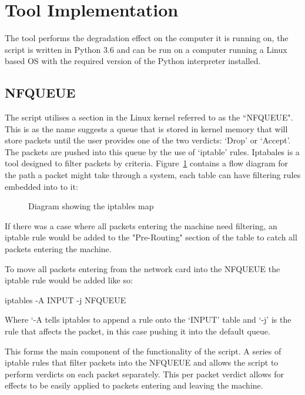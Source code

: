 %
\section{Tool Implementation}
The tool performs the degradation effect on the computer it is running on, the script is written in Python 3.6 \citep{pranskevichuspython} and can be run on a computer running a Linux based OS with the required version of the Python interpreter installed.


\subsection{NFQUEUE}
\label{ref:nfqueue}
The script utilises a section in the Linux kernel referred to as the ``NFQUEUE". This is as the name suggests a queue that is stored in kernel memory that will store packets until the user provides one of the two verdicts: `Drop' or `Accept'. The packets are pushed into this queue by the use of `iptable' rules. Iptabales is a tool designed to filter packets by criteria. Figure~\ref{ref:iptables} contains a flow diagram for the path a packet might take through a system, each table can have filtering rules embedded into to it:


\begin{figure}[h]
	\caption{Diagram showing the iptables map}
	\label{ref:iptables}
\end{figure}

If there was a case where all packets entering the machine need filtering, an iptable rule would be added to the "Pre-Routing" section of the table to catch all packets entering the machine. 

To move all packets entering from the network card into the NFQUEUE the iptable rule would be added like so:
\begin{center}
	\begin{console_font}
		\large{iptables -A INPUT -j NFQUEUE}
	\end{console_font} 
\end{center}
Where `-A tells iptables to append a rule onto the `INPUT' table and `-j' is the rule that affects the packet, in this case pushing it into the default queue.

This forms the main component of the functionality of the script. A series of iptable rules that filter packets into the NFQUEUE and allows the script to perform verdicts on each packet separately. This per packet verdict allows for effects to be easily applied to packets entering and leaving the machine.

